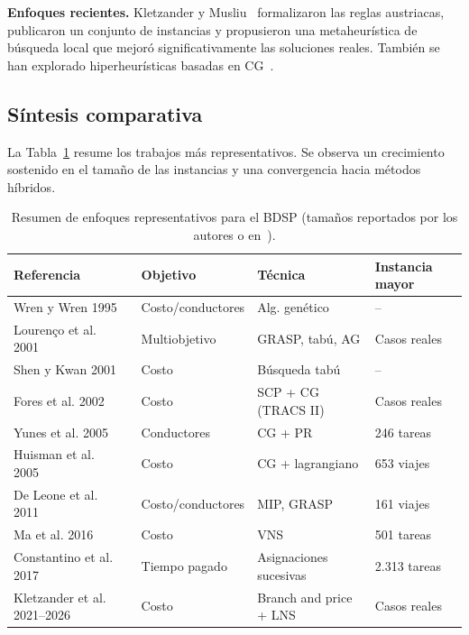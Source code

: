 \documentclass[letter, 10pt]{article}
\begin{document}
\textbf{Enfoques recientes.} Kletzander y Musliu~\cite{Kletzander2020} formalizaron las reglas austriacas, publicaron un conjunto de instancias y propusieron una metaheurística de búsqueda local que mejoró significativamente las soluciones reales. También se han explorado hiperheurísticas basadas en CG~\cite{Li2015}.

\subsection{Síntesis comparativa}
La Tabla~\ref{tab:resumen} resume los trabajos más representativos. Se observa un crecimiento sostenido en el tamaño de las instancias y una convergencia hacia métodos híbridos.

\begin{table}[ht]
\centering
\small
\caption{Resumen de enfoques representativos para el BDSP (tamaños reportados por los autores o en~\cite{Constantino2017}).}
\label{tab:resumen}
\setlength{\tabcolsep}{4pt}
\begin{tabular}{@{}llll@{}}
\toprule
Referencia & Objetivo & Técnica & Instancia mayor \\
\midrule
Wren y Wren 1995~\cite{WrenWren1995} & Costo/conductores & Alg. genético & -- \\
Lourenço et al. 2001~\cite{Lourenco2001} & Multiobjetivo & GRASP, tabú, AG & Casos reales \\
Shen y Kwan 2001~\cite{ShenKwan2001} & Costo & Búsqueda tabú & -- \\
Fores et al. 2002~\cite{Fores2002} & Costo & SCP + CG (TRACS II) & Casos reales \\
Yunes et al. 2005~\cite{Yunes2005} & Conductores & CG + PR & 246 tareas \\
Huisman et al. 2005~\cite{Huisman2005} & Costo & CG + lagrangiano & 653 viajes \\
De Leone et al. 2011~\cite{DeLeone2011a} & Costo/conductores & MIP, GRASP & 161 viajes \\
Ma et al. 2016~\cite{Ma2016} & Costo & VNS & 501 tareas \\
Constantino et al. 2017~\cite{Constantino2017} & Tiempo pagado & Asignaciones sucesivas & 2.313 tareas \\
Kletzander et al. 2021--2026~\cite{Kletzander2021,Kletzander2026} & Costo & Branch and price + LNS & Casos reales \\
\bottomrule
\end{tabular}
\end{table}
\end{document}
